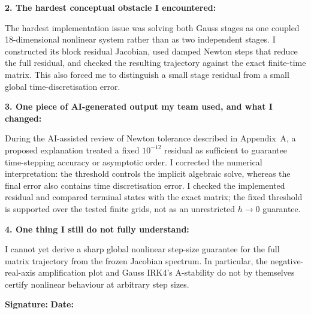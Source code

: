 \documentclass[11pt,a4paper]{article}
\begin{document}
\begin{formbox}
\textbf{2. The hardest conceptual obstacle I encountered:}

The hardest implementation issue was solving both Gauss stages as one coupled
18-dimensional nonlinear system rather than as two independent stages. I
constructed its block residual Jacobian, used damped Newton steps that reduce
the full residual, and checked the resulting trajectory against the exact
finite-time matrix. This also forced me to distinguish a small stage residual
from a small global time-discretisation error.

\textbf{3. One piece of AI-generated output my team used, and what I changed:}

During the AI-assisted review of Newton tolerance described in Appendix~A,
a proposed explanation treated a fixed $10^{-12}$ residual as sufficient to
guarantee time-stepping accuracy or asymptotic order. I corrected the
numerical interpretation: the threshold controls the
implicit algebraic solve, whereas the final error also contains time
discretisation error. I checked the implemented residual and compared terminal
states with the exact matrix; the fixed threshold is supported over the
tested finite grids, not as an unrestricted $h\to0$ guarantee.

\textbf{4. One thing I still do not fully understand:}

I cannot yet derive a sharp global nonlinear step-size guarantee for the full
matrix trajectory from the frozen Jacobian spectrum. In particular, the
negative-real-axis amplification plot and Gauss IRK4's A-stability do not by
themselves certify nonlinear behaviour at arbitrary step sizes.

\vspace{0.5em}
\textbf{Signature:} \underline{\hspace{4.5cm}} \hfill
\textbf{Date:} \underline{\hspace{2.5cm}}
\end{formbox}
\end{document}
